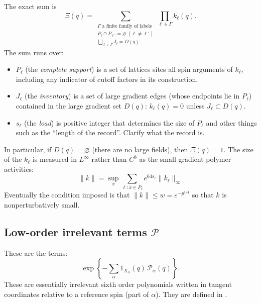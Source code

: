 \documentclass[11pt]{article}
\newcommand{\red}{\color{red}}
\numberwithin{equation}{section}
\theoremstyle{definition}
\theoremstyle{plain}
\begin{document}
The exact sum is
\begin{equation}
 \Xi(q)=\sum_{\substack{\Gamma\text{ a finite family of labels}\\
       P_\ell\cap P_{\ell'}=\varnothing\ (\ell\ne\ell')\\
       \bigsqcup_{\ell\in\Gamma}J_\ell=D(q)}}
                    \prod_{\ell\in\Gamma}k_\ell(q).
 \label{eq:covering}
\end{equation}
The sum runs over:
\begin{itemize}
\item $P_\ell$ (the \emph{complete support}) is a set of lattices sites
all spin arguments of $k_\ell$, including any indicator of cutoff factors in its construction.

\item $J_\ell$ (the \emph{inventory}) is a set of large gradient edges
(whose endpoints lie in $P_\ell$) contained in the large gradient set $D(q)$:
$k_\ell(q)=0$ unless $J_\ell \subset D(q)$.
\item $s_\ell$ (the \emph{load}) is positive integer that determines the 
size of $P_\ell$ and other things such as the ``length of the record''. {\red Clarify what the record is.}
\end{itemize}
In particular, if $D(q)=\varnothing$ (there are no large fields), then $\Xi(q)=1$.
The size of the $k_\ell$ is measured in $L^\infty$ rather than $C^8$ as the small gradient
polymer activities:
\begin{equation}
 \|k\|
 = \sup_x\sum_{\ell:x\in P_\ell}
 e^{64s_\ell}\|k_\ell\|_\infty
 \label{eq:cover-bound}
\end{equation}
Eventually the condition imposed is that $\|k\| \le w=e^{-p^{1/4}}$
so that $k$ is nonperturbatively small.

\subsection{Low-order irrelevant terms $\mathcal P$}

These are the terms:
\begin{equation}
\exp\!\left\{
 -\sum_{\alpha}
       1_{X_\alpha}(q)\,\mathcal P_\alpha(q) \right\}
       .
\end{equation}
These are essentially irrelevant sixth order polynomials
written in tangent coordinates relative to a reference spin (part of $\alpha$).
They are defined in \cite[(3.13)--(3.19)]{OpenAI-O3}.
\end{document}
